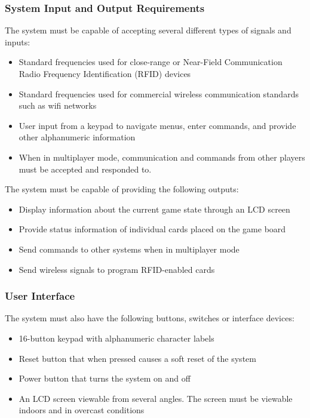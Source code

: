 \documentclass[12pt]{article} %
\begin{document}
\subsubsection{System Input and Output Requirements}

The system must be capable of accepting several different types of signals and
inputs:

\begin{itemize}
	\item Standard frequencies used for close-range or Near-Field Communication
		Radio Frequency Identification (RFID) devices
	\item Standard frequencies used for commercial wireless communication
		standards such as wifi networks
	\item User input from a keypad to navigate menus, enter commands, and provide
		other alphanumeric information
	\item When in multiplayer mode, communication and commands from other players
		must be accepted and responded to.
\end{itemize}

The system must be capable of providing the following outputs:
\begin{itemize}
	\item Display information about the current game state through an LCD screen
	\item Provide status information of individual cards placed on the game board
	\item Send commands to other systems when in multiplayer mode
	\item Send wireless signals to program RFID-enabled cards
\end{itemize}

\subsubsection{User Interface}

The system must also have the following buttons, switches or interface devices:

\begin{itemize}
	\item 16-button keypad with alphanumeric character labels
	\item Reset button that when pressed causes a soft reset of the system
	\item Power button that turns the system on and off
	\item An LCD screen viewable from several angles. The screen must be viewable indoors and in overcast conditions
\end{itemize}
\end{document}
